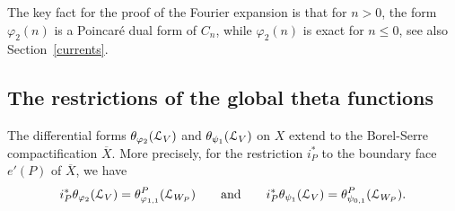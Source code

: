 The key fact for the proof of the Fourier expansion is that for
$n>0$, the form $\varphi_2(n)$ is a Poincar\'e dual form of $C_n$,
while $\varphi_2(n)$ is exact for $n \leq 0$, see also
Section~\ref{currents}.








\subsection{The restrictions of the global theta functions}


\begin{theorem}\label{restriction}

The differential forms $\theta_{\varphi_2}(\mathcal{L}_V)$ and
$\theta_{\psi_1}(\mathcal{L}_V)$ on $X$ extend to the Borel-Serre
compactification $\overline{X}$. More precisely, for the restriction
$i_P^{\ast}$ to the boundary face $e'(P)$ of $\overline{X}$, we
have
\[
i_P^{\ast} \theta_{\varphi_2}(\mathcal{L}_V) = \theta^P_{\varphi_{1,1}}(\mathcal{L}_{W_P}) \qquad \text{and} \qquad i_P^{\ast} \theta_{\psi_1}(\mathcal{L}_V) =  \theta^P_{\psi_{0,1}}(\mathcal{L}_{W_P}). 
\]
\end{theorem}


